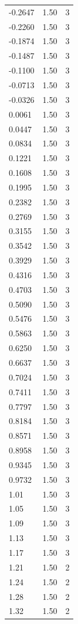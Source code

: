 \begin{longtable}{lrr}
  -0.2647 & 1.50 & 3 \\
  -0.2260 & 1.50 & 3 \\
  -0.1874 & 1.50 & 3 \\
  -0.1487 & 1.50 & 3 \\
  -0.1100 & 1.50 & 3 \\
  -0.0713 & 1.50 & 3 \\
  -0.0326 & 1.50 & 3 \\
  0.0061 & 1.50 & 3 \\
  0.0447 & 1.50 & 3 \\
  0.0834 & 1.50 & 3 \\
  0.1221 & 1.50 & 3 \\
  0.1608 & 1.50 & 3 \\
  0.1995 & 1.50 & 3 \\
  0.2382 & 1.50 & 3 \\
  0.2769 & 1.50 & 3 \\
  0.3155 & 1.50 & 3 \\
  0.3542 & 1.50 & 3 \\
  0.3929 & 1.50 & 3 \\
  0.4316 & 1.50 & 3 \\
  0.4703 & 1.50 & 3 \\
  0.5090 & 1.50 & 3 \\
  0.5476 & 1.50 & 3 \\
  0.5863 & 1.50 & 3 \\
  0.6250 & 1.50 & 3 \\
  0.6637 & 1.50 & 3 \\
  0.7024 & 1.50 & 3 \\
  0.7411 & 1.50 & 3 \\
  0.7797 & 1.50 & 3 \\
  0.8184 & 1.50 & 3 \\
  0.8571 & 1.50 & 3 \\
  0.8958 & 1.50 & 3 \\
  0.9345 & 1.50 & 3 \\
  0.9732 & 1.50 & 3 \\
  1.01 & 1.50 & 3 \\
  1.05 & 1.50 & 3 \\
  1.09 & 1.50 & 3 \\
  1.13 & 1.50 & 3 \\
  1.17 & 1.50 & 3 \\
  1.21 & 1.50 & 2 \\
  1.24 & 1.50 & 2 \\
  1.28 & 1.50 & 2 \\
  1.32 & 1.50 & 2 \\

\end{longtable}
